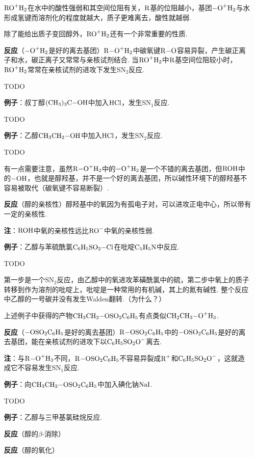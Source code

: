 \documentclass{article}
\begin{document}
$\ce{RO+H2}$在水中的酸性强弱和其空间位阻有关，$\ce{R}$基的位阻越小，基团$\ce{-O^+H2}$与水形成氢键而溶剂化的程度就越大，质子更难离去，酸性就越弱.

除了能给出质子变回醇外，$\ce{RO+H2}$还有一个非常重要的性质.

\textbf{反应}（$\ce{-O^+H2}$是好的离去基团）$\ce{R-O+H2}$中碳氧键$\ce{R-O}$容易异裂，产生碳正离子和水，碳正离子又常常与亲核试剂结合. 当$\ce{RO+H2}$中$\ce{R}$基空间位阻较小时，$\ce{RO+H2}$常常在亲核试剂的进攻下发生SN$_2$反应.

TODO

\textbf{例子}：叔丁醇$\ce{(CH3)3C-OH}$中加入$\ce{HCl}$，发生SN$_1$反应.

TODO

\textbf{例子}：乙醇$\ce{CH3CH2-OH}$中加入$\ce{HCl}$，发生SN$_2$反应.

TODO

有一点需要注意，虽然$\ce{R-O+H2}$中的$\ce{-O^+H2}$是一个不错的离去基团，但$\ce{ROH}$中的$\ce{-OH}$，也就是醇羟基，并不是一个好的离去基团，所以碱性环境下的醇羟基不容易被取代（碳氧键不容易断裂）.

\textbf{反应}（醇的亲核性）醇羟基中的氧因为有孤电子对，可以进攻正电中心，所以带有一定的亲核性.

\textbf{注}：$\ce{ROH}$中氧的亲核性远比$\ce{RO-}$中氧的亲核性弱.

\textbf{例子}：乙醇与苯硫酰氯$\ce{C6H5SO2-Cl}$在吡啶$\ce{C5H5N}$中反应.

TODO

第一步是一个SN$_2$反应，由乙醇中的氧进攻苯磺酰氯中的硫，第二步中氧上的质子转移到作为溶剂的吡啶上，吡啶是一种常用的有机碱，其上的氮有碱性. 整个反应中乙醇的一号碳并没有发生Walden翻转.（为什么？）

上述例子中获得的产物$\ce{CH3CH2-OSO2C6H5}$有点类似$\ce{CH2CH3-O+H3}$.

\textbf{反应}（$\ce{-OSO2C6H5}$是好的离去基团）$\ce{R-OSO2C6H5}$中的$\ce{-OSO2C6H5}$是好的离去基团，能在亲核试剂的进攻下以$\ce{C6H5SO2O-}$离去.

\textbf{注}：与$\ce{R-O+H3}$不同，$\ce{R-OSO2C6H5}$不容易异裂成$\ce{R+}$和$\ce{C6H5SO2O-}$，这就造成它不容易发生SN$_1$反应.

\textbf{例子}：向$\ce{CH3CH2-OSO2C6H5}$中加入碘化钠$\ce{NaI}$.

TODO

\textbf{例子}：乙醇与三甲基氯硅烷反应.

\textbf{反应}（醇的$\beta$-消除）

\textbf{反应}（醇的氧化）
\end{document}
